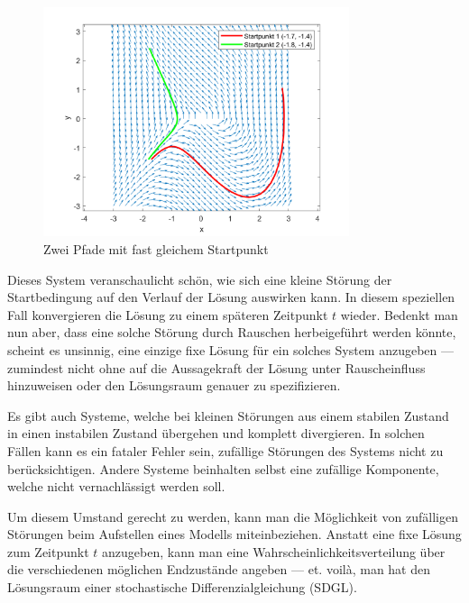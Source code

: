 \begin{figure}
	\centering
	\includegraphics[width=0.8\textwidth]{papers/brown/images/Vektorfeld-mit-zwei-Pfaden.png}
	\caption{Zwei Pfade mit fast gleichem Startpunkt}
	\label{brown:divergentAndConvergentSystem}
\end{figure}

Dieses System veranschaulicht schön, wie sich eine kleine Störung der Startbedingung auf den Verlauf der Lösung auswirken kann. In diesem speziellen Fall konvergieren die Lösung zu einem späteren Zeitpunkt $ t $ wieder. Bedenkt man nun aber, dass eine solche Störung durch Rauschen herbeigeführt werden könnte, scheint es unsinnig, eine einzige fixe Lösung für ein solches System anzugeben --- zumindest nicht ohne auf die Aussagekraft der Lösung unter Rauscheinfluss hinzuweisen oder den Lösungsraum genauer zu spezifizieren.

Es gibt auch Systeme, welche bei kleinen Störungen aus einem stabilen Zustand in einen instabilen Zustand übergehen und komplett divergieren. In solchen Fällen kann es ein fataler Fehler sein, zufällige Störungen des Systems nicht zu berücksichtigen. Andere Systeme beinhalten selbst eine zufällige Komponente, welche nicht vernachlässigt werden soll.

Um diesem Umstand gerecht zu werden, kann man die Möglichkeit von zufälligen Störungen beim Aufstellen eines Modells miteinbeziehen. Anstatt eine fixe Lösung zum Zeitpunkt $ t $ anzugeben, kann man eine Wahrscheinlichkeitsverteilung über die verschiedenen möglichen Endzustände angeben --- et. voilà, man hat den Lösungsraum einer stochastische Differenzialgleichung (SDGL).
